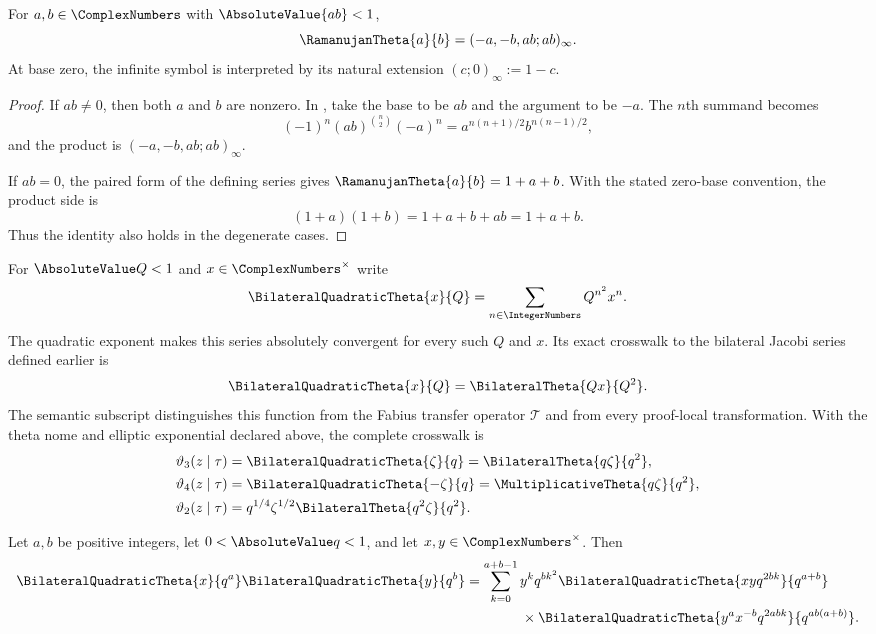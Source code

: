 \begin{proposition}
\label{qg:prop-ramanujan-product}
For $a,b\in\ComplexNumbers$ with $\AbsoluteValue{ab}<1$,
\begin{equation}
 \RamanujanTheta{a}{b}=(-a,-b,ab;ab)_\infty.
\label{eq:qg-ramanujan-product}
\end{equation}
At base zero, the infinite symbol is interpreted by its natural extension
$(c;0)_\infty:=1-c$.
\end{proposition}

\begin{proof}
If $ab\ne0$, then both $a$ and $b$ are nonzero.  In , take
the base to be $ab$ and the argument to be $-a$.  The $n$th summand becomes
\[
 (-1)^n(ab)^{\binom n2}(-a)^n
 =a^{n(n+1)/2}b^{n(n-1)/2},
\]
and the product is $(-a,-b,ab;ab)_\infty$.

If $ab=0$, the paired form of the defining series gives
$\RamanujanTheta{a}{b}=1+a+b$.  With the stated zero-base convention, the product side is
\[
 (1+a)(1+b)=1+a+b+ab=1+a+b.
\]
Thus the identity also holds in the degenerate cases.
\end{proof}

For $\AbsoluteValue Q<1$ and $x\in\ComplexNumbers^\times$ write
\[
 \BilateralQuadraticTheta{x}{Q}
 =\sum_{n\in\IntegerNumbers}Q^{n^2}x^n.
\]
The quadratic exponent makes this series absolutely convergent for every such
$Q$ and $x$.
Its exact crosswalk to the bilateral Jacobi series defined earlier is
\[
 \BilateralQuadraticTheta{x}{Q}=\BilateralTheta{Qx}{Q^2}.
\]
The semantic subscript distinguishes this function from the Fabius transfer
operator $\mathcal T$ and from every proof-local transformation.
With the theta nome and elliptic exponential declared above, the complete
crosswalk is
\begin{align*}
 \vartheta_3(z\mid\tau)
 &=\BilateralQuadraticTheta{\zeta}{q}
  =\BilateralTheta{q\zeta}{q^2},\\
 \vartheta_4(z\mid\tau)
 &=\BilateralQuadraticTheta{-\zeta}{q}
  =\MultiplicativeTheta{q\zeta}{q^2},\\
 \vartheta_2(z\mid\tau)
 &=q^{1/4}\zeta^{1/2}\BilateralTheta{q^2\zeta}{q^2}.
\end{align*}

\begin{theorem}
\label{qg:thm-schroeter}
Let $a,b$ be positive integers, let $0<\AbsoluteValue q<1$, and let
$x,y\in\ComplexNumbers^\times$.  Then
\begin{align}
 \BilateralQuadraticTheta{x}{q^a}\BilateralQuadraticTheta{y}{q^b}
 &=\sum_{k=0}^{a+b-1}y^kq^{bk^2}
 \BilateralQuadraticTheta{xyq^{2bk}}{q^{a+b}}\notag\\
 &\qquad\qquad\times
 \BilateralQuadraticTheta{y^ax^{-b}q^{2abk}}{q^{ab(a+b)}}.
\label{eq:qg-schroeter}
\end{align}
\end{theorem}

